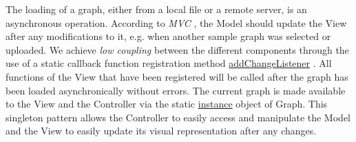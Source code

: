The loading of a graph, either from a local file or a remote server, is an asynchronous operation. According to \textit{MVC} , the Model should update the View  after any modifications to it, e.g. when another sample graph was selected or uploaded. We achieve \textit{low coupling}  between the different components through the use of a static callback function registration method \underline{addChangeListener} . All functions of the View that have been registered will be called after the graph has been loaded asynchronically without errors. The current graph is made available to the View and the Controller  via the static \underline{instance} object of Graph. This singleton pattern allows the Controller to easily access and manipulate the Model and the View to easily update its visual representation after any changes.  %



